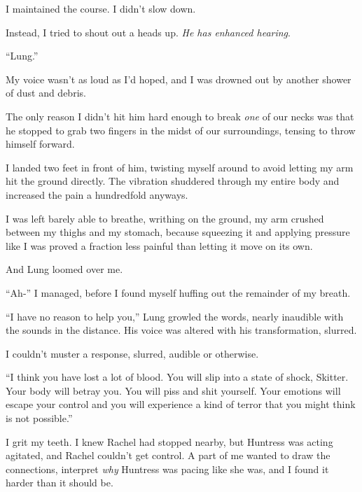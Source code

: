 I maintained the course.  I didn't slow down.



Instead, I tried to shout out a heads up.  \emph{He has enhanced hearing}.



``Lung.''



My voice wasn't as loud as I'd hoped, and I was drowned out by another shower of dust and debris.



The only reason I didn't hit him hard enough to break \emph{one} of our necks was that he stopped to grab two fingers in the midst of our surroundings, tensing to throw himself forward.



I landed two feet in front of him, twisting myself around to avoid letting my arm hit the ground directly.  The vibration shuddered through my entire body and increased the pain a hundredfold anyways.



I was left barely able to breathe, writhing on the ground, my arm crushed between my thighs and my stomach, because squeezing it and applying pressure like I was proved a fraction less painful than letting it move on its own.



And Lung loomed over me.



``Ah-''  I managed, before I found myself huffing out the remainder of my breath.



``I have no reason to help you,'' Lung growled the words, nearly inaudible with the sounds in the distance.  His voice was altered with his transformation, slurred.



I couldn't muster a response, slurred, audible or otherwise.



``I think you have lost a lot of blood.  You will slip into a state of shock, Skitter.  Your body will betray you.  You will piss and shit yourself.  Your emotions will escape your control and you will experience a kind of terror that you might think is not possible.''



I grit my teeth.  I knew Rachel had stopped nearby, but Huntress was acting agitated, and Rachel couldn't get control.  A part of me wanted to draw the connections, interpret \emph{why} Huntress was pacing like she was, and I found it harder than it should be.



